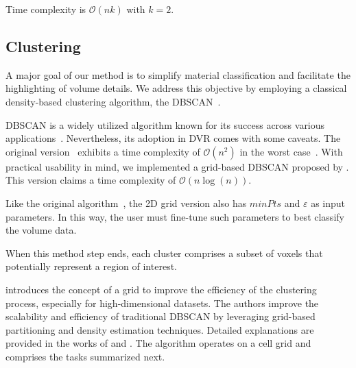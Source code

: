 Time complexity is $\mathcal{O}(nk)$ with $k=2$.

\subsection{Clustering}
\label{subsect:clustering}
A major goal of our method is to simplify material classification and facilitate the highlighting of volume details. We address this objective by employing a classical density-based clustering algorithm, the DBSCAN~\cite{ester1996}. 

DBSCAN is a widely utilized algorithm known for its success across various applications~\cite{schubert2017}. Nevertheless, its adoption in DVR comes with some caveats.  The original version~\cite{ester1996} exhibits a time complexity of $\mathcal{O} (n^2)$ in the worst case~\cite{schubert2017}. With practical usability in mind, we implemented a grid-based  DBSCAN proposed by \cite{gunawan2013}. This version claims a time complexity of $\mathcal{O} (n \log (n))$. 

Like the original algorithm~\cite{ester1996}, the 2D grid version also has $minPts$ and $\varepsilon$ as input parameters. In this way, the user must fine-tune such parameters to best classify the volume data. 

When this method step ends, each cluster comprises a subset of voxels that potentially represent a region of interest.

\cite{gunawan2013} introduces the concept of a grid to improve the efficiency of the clustering process, especially for high-dimensional datasets. The authors improve the scalability and efficiency of traditional DBSCAN by leveraging grid-based partitioning and density estimation techniques. Detailed explanations are provided in the works of \cite{gunawan2013} and \cite{gan2015}. The algorithm operates on a cell grid and comprises the tasks summarized next.

